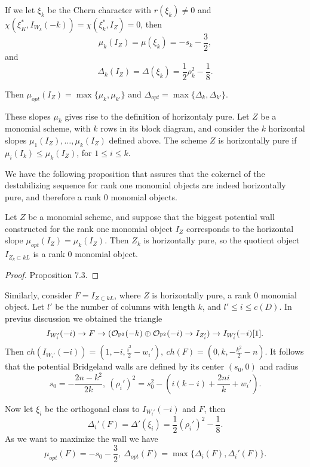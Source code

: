 \documentclass[
	oldfontcommands,
	sumario=abnt-6027-2012,
	12pt,			%
	openright,		%
	oneside,		%
	a4paper,		%
	english,		%
	brazil			%
	]{imecc-unicamp}
\begin{document}
If we let $\xi_k$ be the Chern character with $r(\xi_k)\neq 0$ and $\chi(\xi_K^*,I_{W_k}(-k))=\chi(\xi_k^*,I_Z)=0$, then $$\mu_k(I_Z)=\mu(\xi_k)=-s_k-\frac{3}{2},$$ 
and $$
\Delta_k(I_Z)=\Delta(\xi_k)=\frac{1}{2}\rho^2_k-\frac{1}{8}.
$$

Then $\mu_{opt}(I_Z)=\max\{\mu_k,\mu_{k'}  \}$ and $\Delta_{opt}=\max\{\Delta_k,\Delta_{k'}  \}$.
\begin{definition}
	These slopes $\mu_k$ gives rise to the definition of horizontaly pure. Let $Z$ be a monomial scheme, with $k$ rows in its block diagram, and consider the $k$ horizontal slopes $\mu_1(I_Z),\dots,\mu_k(I_Z)$ defined above. The scheme $Z$ is horizontally pure if $\mu_i(I_k)\le \mu_k(I_Z)$, for $1\le i\le k$. 	
\end{definition}

We have the following proposition that assures that the cokernel of the destabilizing sequence for rank one monomial objects are indeed horizontally pure, and therefore a rank $0$ monomial objects.

\begin{proposition}
	Let $Z$ be a monomial scheme, and suppose that the biggest potential wall constructed for the rank one monomial object $I_Z$ corresponds to the horizontal slope $\mu_{opt}(I_Z)=\mu_k(I_Z)$. Then $Z_k$ is horizontally pure, so the quotient object $I_{Z_k\subset kL}$ is a rank $0$ monomial object.
\end{proposition}
\begin{proof}
	\cite{COSKUN} Proposition $7.3$.
\end{proof}

Similarly, consider $F=I_{Z\subset kL}$, where $Z$ is horizontally pure, a rank $0$ monomial object. Let $l'$ be the number of columns with length $k$, and $l'\le i\le c(D)$. In previus discussion we obtained the triangle $$
I_{W_i'}(-i)\rightarrow F\rightarrow ({\mathcal O}_{{\mathbb P}^2}(-k)\oplus{\mathcal O}_{{\mathbb P}^2}(-i)\rightarrow I_{Z_i'})\rightarrow I_{W_i'}(-i)[1].
$$ 
Then $ch(I_{W_i'}(-i))=(1,-i,\frac{i^2}{2}-w_i'), ~ch(F)=(0,k,-\frac{k^2}{2}-n)$. It follows that the potential Bridgeland walls are defined by its center $(s_0,0)$ and radius $$
s_0=-\frac{2n-k^2}{2k}, ~(\rho_i')^2=s_0^2-(i(k-i)+\frac{2ni}{k}+w_i').
$$

Now let $\xi_i$ be the orthogonal class to $I_{W_i'}(-i)$ and $F$, then $$
\Delta_i'(F)=\Delta'(\xi_i)=\frac{1}{2}(\rho_i')^2-\frac{1}{8}.
$$
As we want to maximize the wall we have $$
\mu_{opt}(F)=-s_0-\frac{3}{2},~\Delta_{opt}(F)=\max\{\Delta_i(F), \Delta_i'(F)  \}.
$$
\end{document}

